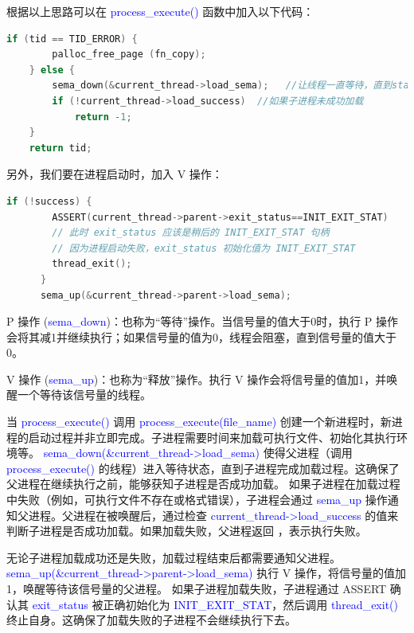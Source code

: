 \documentclass[14pt,a4paper,UTF8,twoside]{article}
\renewcommand{\texttt}[1]{\textcolor{blue}{\ttfamily #1}}
\begin{document}
根据以上思路可以在 \texttt{process\_execute()} 函数中加入以下代码：

\begin{lstlisting}[language=C, title = process\_execute()]
    if (tid == TID_ERROR) {
        palloc_free_page (fn_copy);
    } else { 
        sema_down(&current_thread->load_sema);   //让线程一直等待，直到start process（）退出。
        if (!current_thread->load_success)  //如果子进程未成功加载
            return -1;   
    }
    return tid;
\end{lstlisting}

另外，我们要在进程启动时，加入 V 操作：

\begin{lstlisting}[language=C, title = start\_process()]
    if (!success) {
        ASSERT(current_thread->parent->exit_status==INIT_EXIT_STAT)
        // 此时 exit_status 应该是稍后的 INIT_EXIT_STAT 句柄
        // 因为进程启动失败，exit_status 初始化值为 INIT_EXIT_STAT
        thread_exit();
      }
      sema_up(&current_thread->parent->load_sema);
\end{lstlisting}

\begin{ctt}
    P 操作 (\texttt{sema\_down})：也称为“等待”操作。当信号量的值大于0时，执行 P 操作会将其减1并继续执行；如果信号量的值为0，线程会阻塞，直到信号量的值大于0。

    V 操作 (\texttt{sema\_up})：也称为“释放”操作。执行 V 操作会将信号量的值加1，并唤醒一个等待该信号量的线程。
\end{ctt}

\begin{rmr}
    当 \texttt{process\_execute()} 调用 \texttt{process\_execute(file\_name)} 创建一个新进程时，新进程的启动过程并非立即完成。子进程需要时间来加载可执行文件、初始化其执行环境等。  
    \texttt{sema\_down(\&current\_thread->load\_sema)} 使得父进程（调用 \texttt{process\_execute()} 的线程）进入等待状态，直到子进程完成加载过程。这确保了父进程在继续执行之前，能够获知子进程是否成功加载。  
    如果子进程在加载过程中失败（例如，可执行文件不存在或格式错误），子进程会通过 \texttt{sema\_up} 操作通知父进程。父进程在被唤醒后，通过检查 \texttt{current\_thread->load\_success} 的值来判断子进程是否成功加载。如果加载失败，父进程返回 \texttt{-1}，表示执行失败。

    \vspace{0.5cm}

    无论子进程加载成功还是失败，加载过程结束后都需要通知父进程。\texttt{sema\_up(\&current\_thread->parent->load\_sema)} 执行 V 操作，将信号量的值加1，唤醒等待该信号量的父进程。
    如果子进程加载失败，子进程通过 ASSERT 确认其 \texttt{exit\_status} 被正确初始化为 \texttt{INIT\_EXIT\_STAT}，然后调用 \texttt{thread\_exit()} 终止自身。这确保了加载失败的子进程不会继续执行下去。
\end{rmr}
\end{document}
